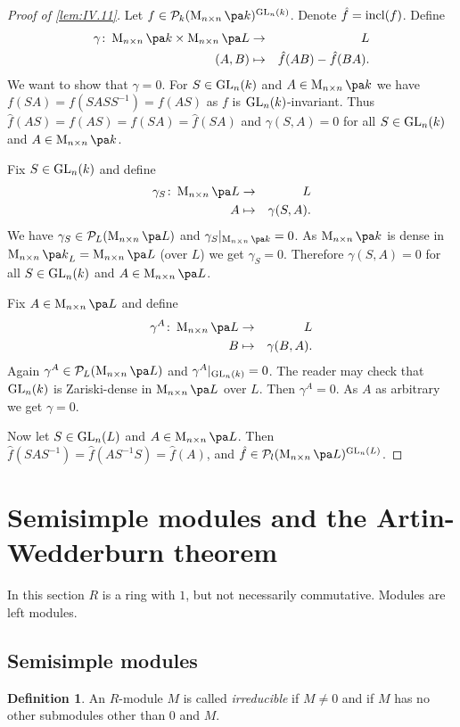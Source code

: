 \documentclass[12pt,a4paper]{scrartcl}
\theoremstyle{cplain}
\theoremstyle{cplain}
\theoremstyle{cplain}
\theoremstyle{definition}
\newtheorem*{deff}{Definition}
\begin{document}
\begin{otherlanguage}{english}
\begin{proof}[Proof of \cref{lem:IV.11}]
  Let $f\in\Ps_k(\Mat nk)^{\GL_n(k)}$. Denote $\hat f = \operatorname{incl}(f)$. Define
  \begin{eqnarray*}
    \gamma\colon \Mat nk \times \Mat nL &\to& L \\
    (A,B) &\mapsto& \hat f (AB) - \hat f(BA). %
  \end{eqnarray*}
  We want to show that $\gamma = 0$. For $S \in \operatorname{GL}_n(k)$ and $A\in\Mat nk$ we have $f(SA) = f(SASS^{-1}) = f(AS)$ as $f$ is $\operatorname{GL}_n(k)$-invariant. Thus $\hat f(AS) = f(AS) = f(SA) =\hat f(SA)$ and $\gamma(S,A) = 0$ for all $S \in \operatorname{GL}_n(k)$ and $A \in \Mat nk$.
  
  Fix $S \in \operatorname{GL}_n(k)$ and define
  \begin{eqnarray*}
    \gamma_S\colon \Mat nL &\to& L \\
    A &\mapsto& \gamma(S,A).
  \end{eqnarray*}
  We have $\gamma_S \in \Ps_L(\Mat nL)$ and $\gamma_S|_{\Mat nk} = 0$. As $\Mat nk$ is dense in ${\Mat nk}_L = \Mat nL$ (over $L$) we get $\gamma_S = 0$. Therefore $\gamma(S,A) = 0$ for all $S \in \operatorname{GL}_n(k)$ and $A \in \Mat nL$.
  
  Fix $A \in \Mat nL$ and define
  \begin{eqnarray*}
    \gamma^A\colon \Mat nL &\to& L \\
    B &\mapsto& \gamma(B,A).
  \end{eqnarray*}
  Again $\gamma^A\in \Ps_L(\Mat nL)$ and $\gamma^A|_{\operatorname{GL}_n(k)} = 0$. The reader may check that $\operatorname{GL}_n(k)$ is Zariski-dense in $\Mat nL$ over $L$. Then $\gamma^A = 0$. As $A$ as arbitrary we get $\gamma = 0$.
  
  Now let $S \in \operatorname{GL}_n(L)$ and $A\in\Mat nL$. Then $\hat f(SAS^{-1}) = \hat f (AS^{-1}S) = \hat f (A)$, and $\hat f \in\Ps_l(\Mat nL)^{\GL_n(L)}$.
\end{proof}

\section{Semisimple modules and the Artin-Wedderburn theorem}
In this section $R$ is a ring with $1$, but not necessarily commutative. Modules are left modules.

\subsection{Semisimple modules}
\begin{deff}
  An $R$-module $M$ is called \emph{irreducible} if $M\neq 0$ and if $M$ has no other submodules other than $0$ and $M$.
\end{deff}


\end{otherlanguage}
\end{document}
